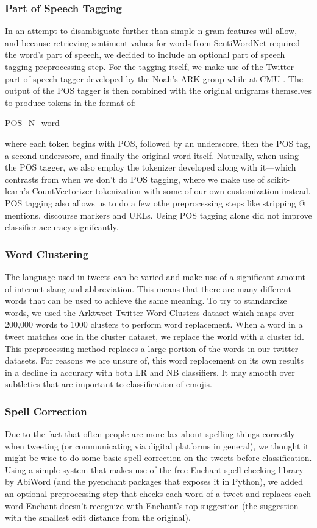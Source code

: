 \documentclass[10pt]{article}
\begin{document}
\subsubsection{Part of Speech Tagging}
In an attempt to disambiguate further than simple n-gram features will allow, and because retrieving sentiment values for words from SentiWordNet required the word's part of speech, we decided to include an optional part of speech tagging preprocessing step. For the tagging itself, we make use of the Twitter part of speech tagger developed by the Noah's ARK group while at CMU \cite{owoputi2013improved}. The output of the POS tagger is then combined with the original unigrams themselves to produce tokens in the format of:
\begin{center}
POS\_N\_word
\end{center}
where each token begins with POS, followed by an underscore, then the POS tag, a second underscore, and finally the original word itself. Naturally, when using the POS tagger, we also employ the tokenizer developed along with it—which contrasts from when we don't do POS tagging, where we make use of scikit-learn's CountVectorizer tokenization with some of our own customization instead. POS tagging also allows us to do a few othe preprocessing steps like stripping @ mentions, discourse markers and URLs. Using POS tagging alone did not improve classifier accuracy signifcantly.

\subsubsection{Word Clustering}
The language used in tweets can be varied and make use of a significant amount of internet slang and abbreviation. This means that there are many different words that can be used to achieve the same meaning. To try to standardize words, we used the Arktweet Twitter Word Clusters dataset which maps over 200,000 words to 1000 clusters to perform word replacement. When a word in a tweet matches one in the cluster dataset, we replace the world with a cluster id. This preprocessing method replaces a large portion of the words in our twitter datasets. For reasons we are unsure of, this word replacement on its own results in a decline in accuracy with both LR and NB classifiers. It may smooth over subtleties that are important to classification of emojis.

\subsubsection{Spell Correction}
Due to the fact that often people are more lax about spelling things correctly when tweeting (or communicating via digital platforms in general), we thought it might be wise to do some basic spell correction on the tweets before classification. Using a simple system that makes use of the free Enchant spell checking library by AbiWord (and the pyenchant packages that exposes it in Python), we added an optional preprocessing step that checks each word of a tweet and replaces each word Enchant doesn't recognize with Enchant's top suggestion (the suggestion with the smallest edit distance from the original).
\end{document}
